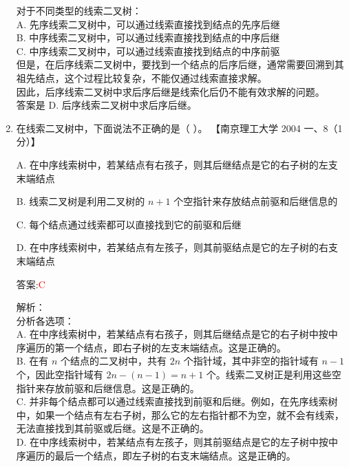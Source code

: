 \documentclass[lang=cn,newtx,10pt,scheme=chinese]{../../../elegantbook}
\begin{document}
\begin{enumerate}
    对于不同类型的线索二叉树：\\
    A. 先序线索二叉树中，可以通过线索直接找到结点的先序后继\\
    B. 中序线索二叉树中，可以通过线索直接找到结点的中序后继\\
    C. 中序线索二叉树中，可以通过线索直接找到结点的中序前驱\\
    
    但是，在后序线索二叉树中，要找到一个结点的后序后继，通常需要回溯到其祖先结点，这个过程比较复杂，不能仅通过线索直接求解。\\
    
    因此，后序线索二叉树中求后序后继是线索化后仍不能有效求解的问题。\\
    
    答案是 D. 后序线索二叉树中求后序后继。\\  

    \item 在线索二叉树中，下面说法不正确的是（ ）。  
    【南京理工大学 2004 一、8（1 分）】  

    A. 在中序线索树中，若某结点有右孩子，则其后继结点是它的右子树的左支末端结点  

    B. 线索二叉树是利用二叉树的 $n + 1$ 个空指针来存放结点前驱和后继信息的  

    C. 每个结点通过线索都可以直接找到它的前驱和后继 

    D. 在中序线索树中，若某结点有左孩子，则其前驱结点是它的左子树的右支末端结点  

    答案:\textcolor{red}{C}
    
    解析：\\
    分析各选项：\\
    A. 在中序线索树中，若某结点有右孩子，则其后继结点是它的右子树中按中序遍历的第一个结点，即右子树的左支末端结点。这是正确的。\\
    
    B. 在有 $n$ 个结点的二叉树中，共有 $2n$ 个指针域，其中非空的指针域有 $n-1$ 个，因此空指针域有 $2n-(n-1)=n+1$ 个。线索二叉树正是利用这些空指针来存放前驱和后继信息。这是正确的。\\
    
    C. 并非每个结点都可以通过线索直接找到前驱和后继。例如，在先序线索树中，如果一个结点有左右子树，那么它的左右指针都不为空，就不会有线索，无法直接找到其前驱或后继。这是不正确的。\\
    
    D. 在中序线索树中，若某结点有左孩子，则其前驱结点是它的左子树中按中序遍历的最后一个结点，即左子树的右支末端结点。这是正确的。\\
    

\end{enumerate}
\end{document}
